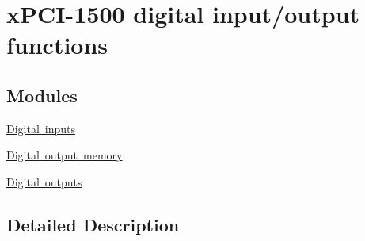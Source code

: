 \hypertarget{group___dig_i_o}{}\section{x\+P\+C\+I-\/1500 digital input/output functions}
\label{group___dig_i_o}
\subsection*{Modules}
\begin{DoxyCompactItemize}
\item 
\mbox{\hyperlink{group___dig_inp}{Digital inputs}}
\item 
\mbox{\hyperlink{group___dig_out_memory}{Digital output memory}}
\item 
\mbox{\hyperlink{group___dig_out}{Digital outputs}}
\end{DoxyCompactItemize}


\subsection{Detailed Description}
